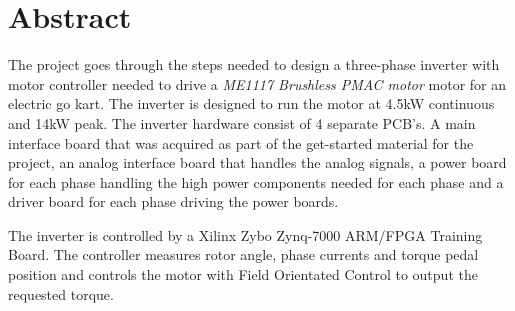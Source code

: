 \section{Abstract}

The project goes through the steps needed to design a three-phase inverter with motor controller needed to drive a \textit{ME1117 Brushless PMAC motor} motor for an electric go kart. 
The inverter is designed to run the motor at 4.5kW continuous and 14kW peak. The inverter hardware consist of 4 separate PCB's. A main interface board that was acquired as part of the get-started material for the project, an analog interface board that handles the analog signals, a power board for each phase handling the high power components needed for each phase and a driver board for each phase driving the power boards. 

The inverter is controlled by a Xilinx Zybo Zynq-7000 ARM/FPGA Training Board. The controller measures rotor angle, phase currents and torque pedal position and controls the motor with Field Orientated Control to output the requested torque. 








